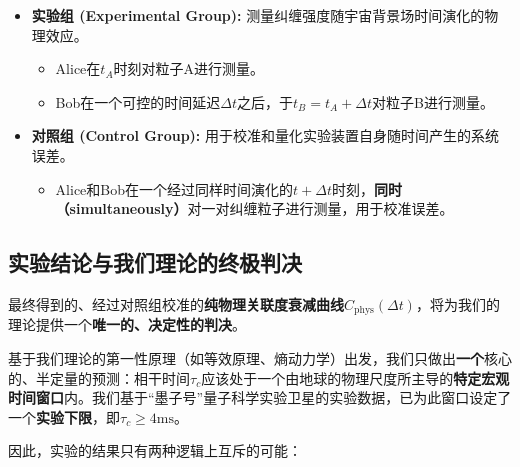 \documentclass[12pt]{article}
\begin{document}
\begin{itemize}
    \item   \textbf{实验组 (Experimental Group):} 测量纠缠强度随宇宙背景场时间演化的物理效应。
    \begin{itemize}
        \item   Alice在$t_A$时刻对粒子A进行测量。
        \item   Bob在一个可控的时间延迟$\Delta t$之后，于$t_B = t_A + \Delta t$对粒子B进行测量。
    \end{itemize}

    \item   \textbf{对照组 (Control Group):} 用于校准和量化实验装置自身随时间产生的系统误差。
    \begin{itemize}
        \item   Alice和Bob在一个经过同样时间演化的$t + \Delta t$时刻，\textbf{同时（simultaneously）}对一对纠缠粒子进行测量，用于校准误差。
    \end{itemize}
\end{itemize}

\subsection{实验结论与我们理论的终极判决}
最终得到的、经过对照组校准的\textbf{纯物理关联度衰减曲线$C_{\text{phys}}(\Delta t)$}，将为我们的理论提供一个\textbf{唯一的、决定性的判决}。

基于我们理论的第一性原理（如等效原理、熵动力学）出发，我们只做出\textbf{一个}核心的、半定量的预测：相干时间$\tau_c$应该处于一个由地球的物理尺度所主导的\textbf{特定宏观时间窗口}内。我们基于``墨子号''量子科学实验卫星的实验数据，已为此窗口设定了一个\textbf{实验下限}，即$\tau_c \geq 4\text{ms}$。

因此，实验的结果只有两种逻辑上互斥的可能：
\end{document}
